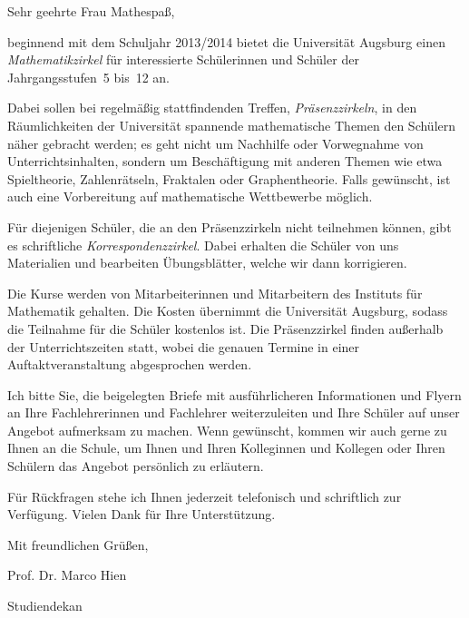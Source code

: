 \documentclass{zirkelbrief}
\begin{document}
\renewcommand{\anschrift}{%
      Holbein-Gymnasium Augsburg \\
      Fachbereich Mathematik \\
      Hallstraße 10 \\
      86150 Augsburg}
\renewcommand{\datum}{2.9.2013}
\renewcommand{\betreff}{Matheschülerzirkel der Universität Augsburg}

\makeletterhead

Sehr geehrte Frau Mathespaß,

beginnend mit dem Schuljahr 2013/2014 bietet die Universität Augsburg
einen \emph{Mathe\-matik\-zir\-kel} für interessierte Schülerinnen und Schüler der
Jahrgangsstufen~5 bis~12 an.

Dabei sollen bei regelmäßig stattfindenden Treffen, \emph{Präsenzzirkeln}, in
den Räum\-lich\-kei\-ten der Universität spannende mathematische Themen den Schülern
näher gebracht werden; es geht nicht um Nachhilfe oder Vorwegnahme von
Unterrichtsinhalten, sondern um Beschäftigung mit anderen Themen wie etwa
Spieltheorie, Zahlenrätseln, Fraktalen oder Graphentheorie. Falls gewünscht, ist
auch eine Vorbereitung auf mathematische Wettbewerbe möglich.

Für diejenigen Schüler, die an den Präsenzzirkeln nicht teilnehmen können, gibt
es schriftliche \emph{Korrespondenzzirkel}. Dabei erhalten die Schüler von uns
Materialien und bearbeiten Übungsblätter, welche wir dann korrigieren.

Die Kurse werden von Mitarbeiterinnen und Mitarbeitern des
Instituts für Mathematik gehalten. Die Kosten übernimmt die Universität Augsburg, sodass
die Teilnahme für die Schüler kostenlos ist. Die Präsenzzirkel finden
außerhalb der Unterrichtszeiten statt, wobei die genauen Termine in einer
Auftaktveranstaltung abgesprochen werden.

Ich bitte Sie, die beigelegten Briefe mit ausführlicheren Informationen und Flyern an Ihre
Fachlehrerinnen und Fachlehrer weiterzuleiten und Ihre Schüler auf unser
Angebot aufmerksam zu machen. Wenn gewünscht, kommen wir auch gerne zu Ihnen an die
Schule, um Ihnen und Ihren Kolleginnen und Kollegen oder Ihren Schülern das
Angebot persönlich zu erläutern.

Für Rückfragen stehe ich Ihnen jederzeit telefonisch und schriftlich 
zur Verfügung. Vielen Dank für Ihre Unterstützung.

Mit freundlichen Grüßen,

\vspace{2cm}

\qquad Prof. Dr. Marco Hien

\vspace{-0.2cm}

\qquad Studiendekan
\end{document}
